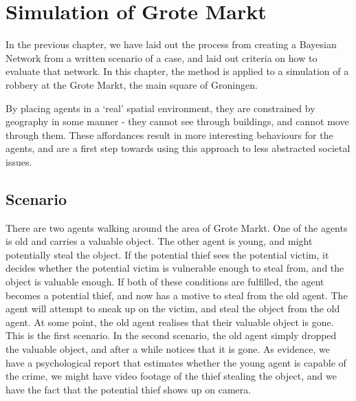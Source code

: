  

\chapter[Simulation of Grote Markt]{Simulation of Grote Markt}

In the previous chapter, we have laid out the process from creating a Bayesian Network from a written scenario of a case, and laid out criteria on how to evaluate that network. In this chapter, the method is applied to a simulation of a robbery at the Grote Markt, the main square of Groningen.

By placing agents in a `real' spatial environment, they are constrained by geography in some manner - they cannot see through buildings, and cannot move through them. These affordances result in more interesting behaviours for the agents, and are a first step towards using this approach to less abstracted societal issues.



\section{Scenario}
There are two agents walking around the area of Grote Markt. One of the agents is old and carries a valuable object. The other agent is young, and might potentially steal the object. If the potential thief sees the potential victim, it decides whether the potential victim is vulnerable enough to steal from, and the object is valuable enough. If both of these conditions are fulfilled, the agent becomes a potential thief, and now has a motive to steal from the old agent. The agent will attempt to sneak up on the victim, and steal the object from the old agent. At some point, the old agent realises that their valuable object is gone. This is the first scenario. In the second scenario, the old agent simply dropped the valuable object, and after a while notices that it is gone. As evidence, we have a psychological report that estimates whether the young agent is capable of the crime, we might have video footage of the thief stealing the object, and we have the fact that the potential thief shows up on camera. 

